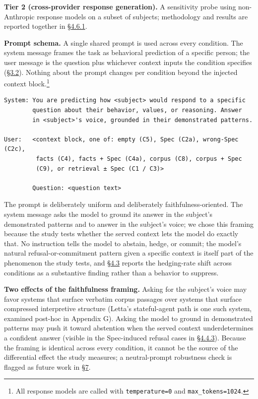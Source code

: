 \textbf{Tier 2 (cross-provider response generation).} A sensitivity
probe using non-Anthropic response models on a subset of subjects;
methodology and results are reported together in \hyperref[cross-provider-response-generation-tier-2-replication]{§4.6.1}.

\textbf{Prompt schema.} A single shared prompt is used across every
condition. The system message frames the task as behavioral prediction
of a specific person; the user message is the question plus whichever
context inputs the condition specifies (\hyperref[experimental-conditions]{§3.2}). Nothing about the prompt
changes per condition beyond the injected context block.\footnote{All
  response models are called with \texttt{temperature=0} and
  \texttt{max\_tokens=1024}.}

\begin{framed}
\small
\begin{verbatim}
System: You are predicting how <subject> would respond to a specific
        question about their behavior, values, or reasoning. Answer
        in <subject>'s voice, grounded in their demonstrated patterns.

User:   <context block, one of: empty (C5), Spec (C2a), wrong-Spec (C2c),
         facts (C4), facts + Spec (C4a), corpus (C8), corpus + Spec
         (C9), or retrieval ± Spec (C1 / C3)>

        Question: <question text>
\end{verbatim}
\end{framed}

The prompt is deliberately uniform and deliberately
faithfulness-oriented. The system message asks the model to ground its
answer in the subject's demonstrated patterns and to answer in the
subject's voice; we chose this framing because the study tests whether
the served context lets the model do exactly that. No instruction tells
the model to abstain, hedge, or commit; the model's natural
refusal-or-commitment pattern given a specific context is itself part of
the phenomenon the study tests, and \hyperref[mechanism-correct-content-not-format]{§4.3} reports the hedging-rate shift
across conditions as a substantive finding rather than a behavior to
suppress.

\textbf{Two effects of the faithfulness framing.} Asking for the
subject's voice may favor systems that surface verbatim corpus passages
over systems that surface compressed interpretive structure (Letta's
stateful-agent path is one such system, examined post-hoc in Appendix
G). Asking the model to ground in demonstrated patterns may push it
toward abstention when the served context underdetermines a confident
answer (visible in the Spec-induced refusal cases in \hyperref[where-the-spec-helps-where-it-hurts-and-which-question-types-route-to-each]{§4.4.3}). Because
the framing is identical across every condition, it cannot be the source
of the differential effect the study measures; a neutral-prompt
robustness check is flagged as future work in \hyperref[future-work]{§7}.

